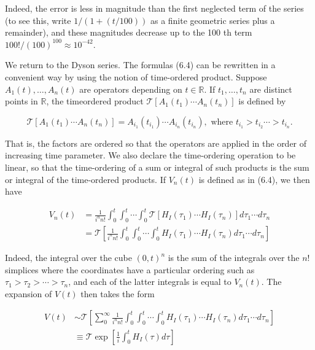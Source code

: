 \documentclass[10pt, letterpaper]{article}
\begin{document}
Indeed, the error is less in magnitude than the first neglected term of the series (to see this, write $1 /(1+(t / 100))$ as a finite geometric series plus a remainder), and these magnitudes decrease up to the 100 th term $100!/(100)^{100} \approx 10^{-42}$.

We return to the Dyson series. The formulas (6.4) can be rewritten in a convenient way by using the notion of time-ordered product. Suppose $A_{1}(t), \ldots, A_{n}(t)$ are operators depending on $t \in \mathbb{R}$. If $t_{1}, \ldots, t_{n}$ are distinct points in $\mathbb{R}$, the timeordered product $\mathcal{T}\left[A_{1}\left(t_{1}\right) \cdots A_{n}\left(t_{n}\right)\right]$ is defined by

$$
\mathcal{T}\left[A_{1}\left(t_{1}\right) \cdots A_{n}\left(t_{n}\right)\right]=A_{i_{1}}\left(t_{i_{1}}\right) \cdots A_{i_{n}}\left(t_{i_{n}}\right), \text { where } t_{i_{1}}>t_{i_{2}} \cdots>t_{i_{n}} .
$$

That is, the factors are ordered so that the operators are applied in the order of increasing time parameter. We also declare the time-ordering operation to be linear, so that the time-ordering of a sum or integral of such products is the sum or integral of the time-ordered products. If $V_{n}(t)$ is defined as in (6.4), we then have

$$
\begin{aligned}
V_{n}(t) & =\frac{1}{i^{n} n!} \int_{0}^{t} \int_{0}^{t} \cdots \int_{0}^{t} \mathcal{T}\left[H_{I}\left(\tau_{1}\right) \cdots H_{I}\left(\tau_{n}\right)\right] d \tau_{1} \cdots d \tau_{n} \\
& =\mathcal{T}\left[\frac{1}{i^{n} n!} \int_{0}^{t} \int_{0}^{t} \cdots \int_{0}^{t} H_{I}\left(\tau_{1}\right) \cdots H_{I}\left(\tau_{n}\right) d \tau_{1} \cdots d \tau_{n}\right]
\end{aligned}
$$

Indeed, the integral over the cube $(0, t)^{n}$ is the sum of the integrals over the $n!$ simplices where the coordinates have a particular ordering such as $\tau_{1}>\tau_{2}>\cdots> \tau_{n}$, and each of the latter integrals is equal to $V_{n}(t)$. The expansion of $V(t)$ then takes the form

$$
\begin{aligned}
V(t) & \sim \mathcal{T}\left[\sum_{0}^{\infty} \frac{1}{i^{n} n!} \int_{0}^{t} \int_{0}^{t} \cdots \int_{0}^{t} H_{I}\left(\tau_{1}\right) \cdots H_{I}\left(\tau_{n}\right) d \tau_{1} \cdots d \tau_{n}\right] \\
& \equiv \mathcal{T} \exp \left[\frac{1}{i} \int_{0}^{t} H_{I}(\tau) d \tau\right]
\end{aligned}
$$
\end{document}
